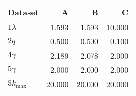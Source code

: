 \begin{tabular}{lrrr}
\toprule
 Dataset      &      A &      B &      C \\
\midrule
 $1 \lambda$  &  \num{1.593} &  \num{1.593} & \num{10.000} \\
 $2 q$        &  \num{0.500} &  \num{0.500} &  \num{0.100} \\
 $4 \gamma$   &  \num{2.189} &  \num{2.078} &  \num{2.000} \\
 $5 \gamma$   &  \num{2.000} &  \num{2.000} &  \num{2.000} \\
 $5 k_{\max}$ & \num{20.000} & \num{20.000} & \num{20.000} \\
\bottomrule
\end{tabular}